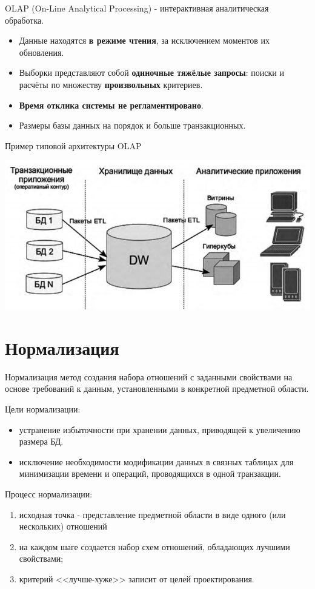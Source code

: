 \documentclass{beamer}
\begin{document}
\begin{frame}
OLAP (On-Line Analytical Processing) - интерактивная аналитическая обработка. 
\begin{itemize}
\item Данные находятся \textbf{в режиме чтения}, за исключением моментов их обновления.
\item Выборки представляют собой \textbf{одиночные тяжёлые запросы}: поиски и расчёты по множеству \textbf{произвольных} критериев.
\item \textbf{Время отклика системы не регламентировано}.
\item Размеры базы данных на порядок и больше транзакционных.
\end{itemize}
\begin{block}{Пример типовой архитектуры OLAP}
\begin{center}
\includegraphics[scale=0.5]{images/olap.png}
\end{center}
\end{block}
\end{frame}

\section{Нормализация}
\begin{frame}
\begin{block}{Нормализация}
метод создания набора отношений с заданными свойствами на основе требований к данным, установленными в конкретной предметной области.
\end{block}
Цели нормализации:
\begin{itemize}
\item устранение избыточности при хранении данных, приводящей к увеличению размера БД.
\item исключение необходимости модификации данных в связных таблицах для минимизации времени и операций, проводящихся в одной транзакции.
\end{itemize}
Процесс нормализации:
\begin{enumerate}
\item исходная точка - представление предметной области в виде одного (или нескольких) отношений
\item на каждом шаге создается набор схем отношений, обладающих лучшими свойствами;
\item критерий <<лучше-хуже>> записит от целей проектирования.
\end{enumerate}
\end{frame}
\end{document}
